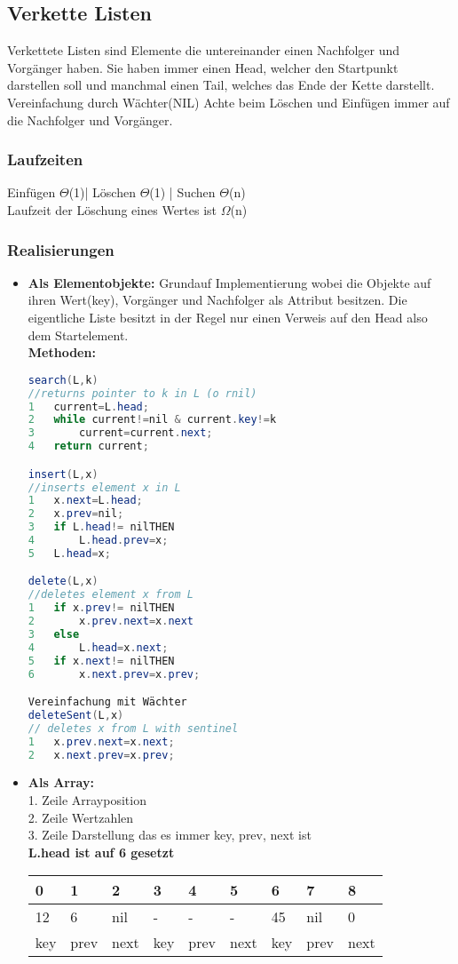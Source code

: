 \documentclass[jou,apacite]{apa6}
\begin{document}
\subsection{Verkette Listen}
Verkettete Listen sind Elemente die untereinander einen Nachfolger und Vorgänger haben. Sie haben immer einen Head, welcher den Startpunkt darstellen soll und manchmal einen Tail, welches das Ende der Kette darstellt. Vereinfachung durch Wächter(NIL) Achte beim Löschen und Einfügen immer auf die Nachfolger und Vorgänger. \\
\subsubsection{Laufzeiten}
Einfügen    $\Theta$(1)| Löschen $\Theta$(1) | Suchen $\Theta$(n) \\
Laufzeit der Löschung eines Wertes ist $\Omega$(n) \\
\subsubsection{Realisierungen}
\begin{itemize}
\item {\bfseries Als Elementobjekte:}
Grundauf Implementierung wobei die Objekte auf ihren Wert(key), Vorgänger und Nachfolger als Attribut besitzen. Die eigentliche Liste besitzt in der Regel nur einen Verweis auf den Head also dem Startelement. \\
{\bfseries Methoden:} 
\begin{lstlisting}[language=java]
search(L,k)   
//returns pointer to k in L (o rnil)
1   current=L.head;
2   while current!=nil & current.key!=k 
3       current=current.next;
4   return current;

insert(L,x)
//inserts element x in L
1   x.next=L.head;
2   x.prev=nil;
3   if L.head!= nilTHEN 
4       L.head.prev=x;
5   L.head=x;

delete(L,x)   
//deletes element x from L
1   if x.prev!= nilTHEN
2       x.prev.next=x.next
3   else
4       L.head=x.next;
5   if x.next!= nilTHEN
6       x.next.prev=x.prev;

Vereinfachung mit Wächter
deleteSent(L,x) 
// deletes x from L with sentinel
1   x.prev.next=x.next;
2   x.next.prev=x.prev;
\end{lstlisting}
\item {\bfseries Als Array:} \\
1. Zeile Arrayposition \\
2. Zeile Wertzahlen \\
3. Zeile Darstellung das es immer key, prev, next ist \\
{\bfseries L.head ist auf 6 gesetzt}
\begin{table}[h]
\centering
\begin{tabular}{|l|l|l|l|l|l|l|l|l|}
\hline
0 & 1 & 2 & 3 & 4 & 5 & 6 & 7 & 8  \\
\hline
12 & 6 & nil & - & - & - & 45 & nil & 0  \\
\hline
key & prev & next & key & prev & next & key & prev & next  \\
\hline
\end{tabular}
\end{table}
\end{itemize}
\end{document}
